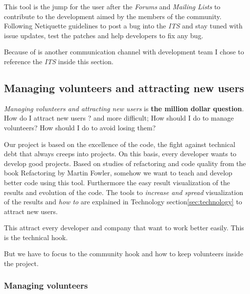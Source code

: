 \documentclass[11pt]{scrartcl}
\begin{document}
\par This tool is the jump for the user after the \emph{Forums} and \emph{Mailing Lists} to contribute to the development aimed by the members of the community. Following Netiquette guidelines to post a bug into the \emph{ITS} and stay tuned with issue updates, test the patches and help developers to fix any bug.

\par Because of is another communication channel with development team I chose to reference the \emph{ITS} inside this section.


\subsection{Managing volunteers and attracting new users}
\label{sub:volunteers-users}

\par \emph{Managing volunteers and attracting new users} is \textbf{the million dollar question}. How do I attract new users ? and more difficult; How should I do to manage volunteers? How should I do to avoid losing them?

\par Our project is based on the excellence of the code, the fight against technical debt that always creeps into projects. On this basis, every developer wants to develop good projects. Based on studies of refactoring and code quality from the book Refactoring by Martin Fowler\cite{refactoring}, somehow we want to teach and develop better code using this tool. Furthermore the easy result visualization of the results and evolution of the code. The tools to \emph{increase and spread} visualization of the results and \emph{how to} are explained in Technology section\ref{sec:technology} to attract new users.

\par This attract every developer and company that want to work better easily. This is the technical hook.

\par But we have to focus to the community hook and how to keep volunteers inside the project.

\subsubsection{Managing volunteers}
\label{sub:volunteers-management}
\end{document}
